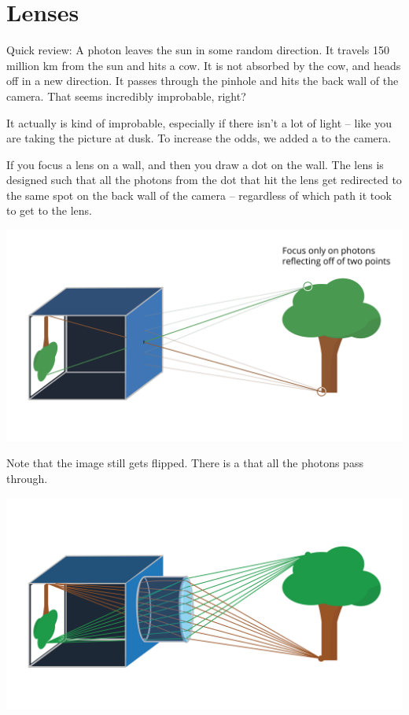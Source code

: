 \section{Lenses}

Quick review: A photon leaves the sun in some random direction. It
travels 150 million km from the sun and hits a cow.  It is not
absorbed by the cow, and heads off in a new direction.  It passes
through the pinhole and hits the back wall of the camera.  That seems
incredibly improbable, right?

It actually is kind of improbable, especially if there isn't a lot of
light -- like you are taking the picture at dusk.  To increase the
odds, we added a  to the camera.

If you focus a lens on a wall, and then you draw a dot on the
wall. The lens is designed such that all the photons from the dot that
hit the lens get redirected to the same spot on the back wall of the
camera -- regardless of which path it took to get to the lens.

\includegraphics[width=1\textwidth]{pinholePoints.png}



Note that the image still gets flipped.  There is a  that all the photons pass through.

\includegraphics[width=1\textwidth]{lensPoints.png}

